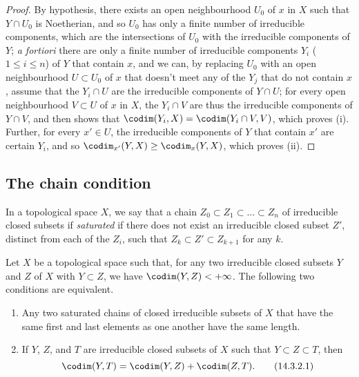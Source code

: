 \begin{proof}
\label{proof-0.14.2.6}
By hypothesis, there exists an open neighbourhood $U_0$ of $x$ in $X$ such that $Y\cap U_0$ is Noetherian, and so $U_0$ has only a finite number of irreducible components, which are the intersections of $U_0$ with the irreducible components of $Y$;
\emph{a fortiori} there are only a finite number of irreducible components $Y_i$ ($1\leq i\leq n$) of $Y$ that contain $x$, and we can, by replacing $U_0$ with an open neighbourhood $U\subset U_0$ of $x$ that doesn't meet any of the $Y_j$ that do not contain $x$, assume that the $Y_i\cap U$ are the irreducible components of $Y\cap U$;
for every open neighbourhood $V\subset U$ of $x$ in $X$, the $Y_i\cap V$ are thus the irreducible components of $Y\cap V$, and  then shows that $\codim(Y_i,X)=\codim(Y_i\cap V,V)$, which proves (i).
Further, for every $x'\in U$, the irreducible components of $Y$ that contain $x'$ are certain $Y_i$, and so $\codim_{x'}(Y,X)\geq\codim_x(Y,X)$, which proves (ii).
\end{proof}

\subsection{The chain condition}
\label{subsection:the-chain-condition}

\begin{env}[14.3.1]
\label{0.14.3.1}
In a topological space $X$, we say that a chain $Z_0\subset Z_1\subset\ldots\subset Z_n$ of irreducible closed subsets if \emph{saturated} if there does not exist an irreducible closed subset $Z'$, distinct from each of the $Z_i$, such that $Z_k\subset Z'\subset Z_{k+1}$ for any $k$.
\end{env}

\begin{prop}[14.3.2]
\label{0.14.3.2}
Let $X$ be a topological space such that, for any two irreducible closed subsets $Y$ and $Z$ of $X$ with $Y\subset Z$, we have $\codim(Y,Z)<+\infty$.
The following two conditions are equivalent.
\begin{enumerate}[label=\emph{(\alph*)}]
    \item Any two saturated chains of closed irreducible subsets of $X$ that have the same first and last elements as one another have the same length.
    \item If $Y$, $Z$, and $T$ are irreducible closed subsets of $X$ such that $Y\subset Z\subset T$, then
        \begin{equation*}
        \label{0.14.3.2.1}
            \codim(Y,T) = \codim(Y,Z)+\codim(Z,T).\tag{14.3.2.1}
        \end{equation*}
\end{enumerate}
\end{prop}

